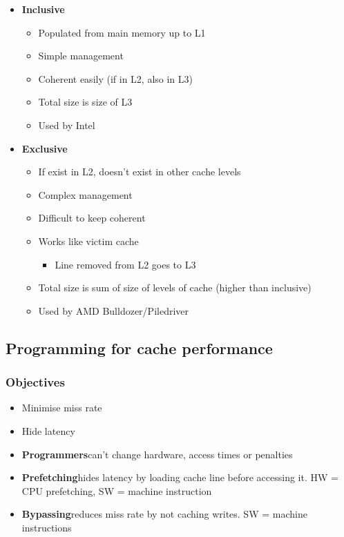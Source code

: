 \documentclass{article}
\newcommand\tab[1][0.5cm]{\hspace*{#1}}
\begin{document}
		\begin{itemize}
			\item \textbf{Inclusive}
			\begin{itemize}
				\item Populated from main memory up to L1
				\item Simple management
				\item Coherent easily (if in L2, also in L3)
				\item Total size is size of L3
				\item Used by Intel
			\end{itemize}

			\item \textbf{Exclusive}
			\begin{itemize}
				\item If exist in L2, doesn't exist in other cache levels
				\item Complex management
				\item Difficult to keep coherent
				\item Works like victim cache
				\begin{itemize}
					\item Line removed from L2 goes to L3
				\end{itemize}
				\item Total size is sum of size of levels of cache (higher than inclusive)
				\item Used by AMD Bulldozer/Piledriver
			\end{itemize}
		\end{itemize}

	\subsection{Programming for cache performance}
		\subsubsection*{Objectives}
			\begin{itemize}
				\item Minimise miss rate
				\item Hide latency
			\end{itemize}

		\begin{itemize}
			\item \textbf{Programmers}\tab can't change hardware, access times or penalties
			\item \textbf{Prefetching}\tab hides latency by loading cache line before accessing it. HW = CPU prefetching, SW = machine instruction
			\item \textbf{Bypassing}\tab reduces miss rate by not caching writes. SW = machine instructions
		\end{itemize}
\end{document}
